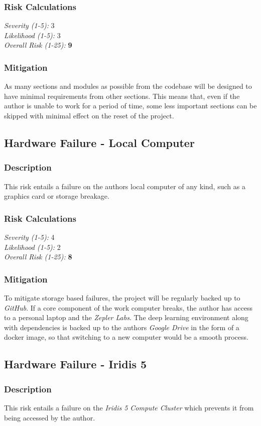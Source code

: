 \documentclass[12pt,a4paper,titlepage]{report}
\begin{document}
	\subsubsection{Risk Calculations}
	\emph{Severity (1-5):} 3 \\
	\emph{Likelihood (1-5):} 3 \\
	\emph{Overall Risk (1-25):} \textbf{9}
	\subsubsection{Mitigation}
	As many sections and modules as possible from the codebase will be designed to have minimal requirements from other sections. This means that, even if the author is unable to work for a period of time, some less important sections can be skipped with minimal effect on the reset of the project.
	\subsection{Hardware Failure - Local Computer}
	\subsubsection{Description}
	This risk entails a failure on the authors local computer of any kind, such as a graphics card or storage breakage.
	\subsubsection{Risk Calculations}
	\emph{Severity (1-5):} 4 \\
	\emph{Likelihood (1-5):} 2 \\
	\emph{Overall Risk (1-25):} \textbf{8}
	\subsubsection{Mitigation}
	To mitigate storage based failures, the project will be regularly backed up to \emph{GitHub}. If a core component of the work computer breaks, the author has access to a personal laptop and the \emph{Zepler Labs}. The deep learning environment along with dependencies is backed up to the authors \emph{Google Drive} in the form of a docker image, so that switching to a new computer would be a smooth process.
	\subsection{Hardware Failure - Iridis 5}
	\subsubsection{Description}
	This risk entails a failure on the \emph{Iridis 5 Compute Cluster} which prevents it from being accessed by the author.
\end{document}
